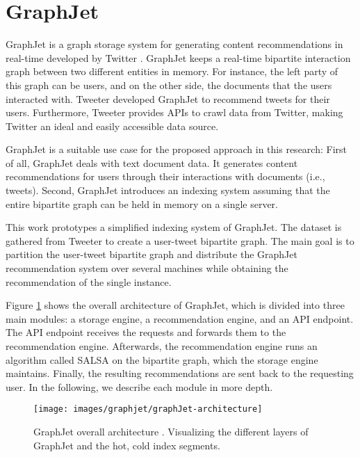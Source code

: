 \section{GraphJet}
\label{sec:GraphJet}
GraphJet is a graph storage system for generating content recommendations in real-time developed by Twitter \cite{sharmaGraphJetRealtimeContent2016}. GraphJet keeps a real-time bipartite interaction graph between two different entities in memory. For instance, the left party of this graph can be users, and on the other side, the documents that the users interacted with. Tweeter developed GraphJet to recommend tweets for their users. Furthermore, Tweeter provides APIs to crawl data from Twitter, making Twitter an ideal and easily accessible data source.


GraphJet is a suitable use case for the proposed approach in this research: First of all, GraphJet deals with text document data. It generates content recommendations for users through their interactions with documents (i.e., tweets). Second, GraphJet introduces an indexing system assuming that the entire bipartite graph can be held in memory on a single server.


This work prototypes a simplified indexing system of GraphJet. The dataset is gathered from Tweeter to create a user-tweet bipartite graph. The main goal is to partition the user-tweet bipartite graph and distribute the GraphJet recommendation system over several machines while obtaining the recommendation of the single instance.


Figure \ref{fig:graphJet-architecture} shows the overall architecture of GraphJet, which is divided into three main modules: a storage engine, a recommendation engine, and an API endpoint. The API endpoint receives the requests and forwards them to the recommendation engine. Afterwards, the recommendation engine runs an algorithm called SALSA \cite{lempelSALSAStochasticApproach2001} on the bipartite graph, which the storage engine maintains. Finally, the resulting recommendations are sent back to the requesting user. In the following, we describe each module in more depth. 

\begin{figure}[!htb]
    \centering
    \texttt{[image: images/graphjet/graphJet-architecture]}
    \caption{GraphJet overall architecture \cite{sharmaGraphJetRealtimeContent2016}. Visualizing the different layers of GraphJet and the hot, cold index segments.}
    \label{fig:graphJet-architecture}
\end{figure}


